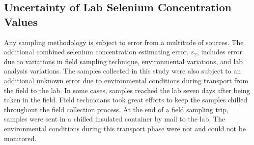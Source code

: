 \begin{linenumbers}
\subtabletop
\begin{table}[htbp]
	\centering
	\caption[DSR dissolved selenium concentration results table.]{DSR dissolved selenium concentration results table.  Values are in units of \si{\micro\gram\per\liter}.}
	\label{tab:DSRConcResults}
	\begin{subtable}{\textwidth}
		\centering
		
	\end{subtable}\\
	\tablevspace
	\begin{subtable}{\textwidth}
		\centering
		
	\end{subtable}\\
\end{table}

\subtablemid
\begin{table}[htbp]
	\centering
	\caption{DSR dissolved selenium concentration results table.}
	\begin{subtable}{\textwidth}
		\centering
		
	\end{subtable}\\
	\tablevspace
	\begin{subtable}{\textwidth}
		\centering
		
	\end{subtable}\\
\end{table}

\subtablemid
\begin{table}[htbp]
	\centering
	\caption{DSR dissolved selenium concentration results table.}
	\begin{subtable}{\textwidth}
		\centering
		
	\end{subtable}\\
\end{table}

\clearpage{}


\subsection{Uncertainty of Lab Selenium Concentration Values}
Any sampling methodology is subject to error from a multitude of sources.  The additional combined selenium concentration estimating error, $\varepsilon_{2}$, includes error due to variations in field sampling technique, environmental variations, and lab analysis variations.  The samples collected in this study were also subject to an additional unknown error due to environmental conditions during transport from the field to the lab.  In some cases, samples reached the lab seven days after being taken in the field.  Field technicians took great efforts to keep the samples chilled throughout the field collection process.  At the end of a field sampling trip, samples were sent in a chilled insulated container by mail to the lab.  The environmental conditions during this transport phase were not and could not be monitored.


\end{linenumbers}
